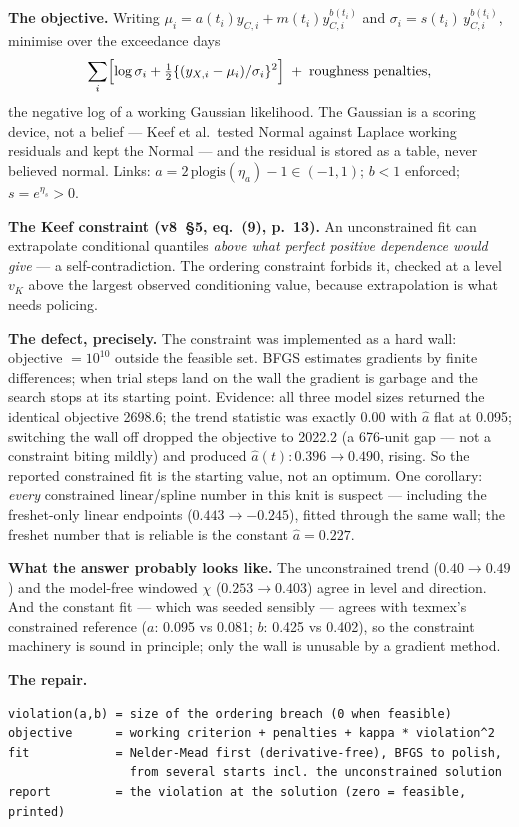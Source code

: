 \documentclass[11pt]{article}
\begin{document}
\textbf{The objective.} Writing $\mu_i = a(t_i) y_{C,i} + m(t_i)
y_{C,i}^{b(t_i)}$ and $\sigma_i = s(t_i)\, y_{C,i}^{b(t_i)}$, minimise over
the exceedance days
\[
\sum_i \Bigl[\log \sigma_i + \tfrac12\{(y_{X,i} - \mu_i)/\sigma_i\}^2\Bigr]
\;+\; \text{roughness penalties},
\]
the negative log of a working Gaussian likelihood. The Gaussian is a scoring
device, not a belief --- Keef et al.\ tested Normal against Laplace working
residuals and kept the Normal --- and the residual is stored as a table, never
believed normal. Links: $a = 2\,\mathrm{plogis}(\eta_a) - 1 \in (-1,1)$;
$b < 1$ enforced; $s = e^{\eta_s} > 0$.

\textbf{The Keef constraint (v8~\S5, eq.~(9), p.~13).} An unconstrained fit
can extrapolate conditional quantiles \emph{above what perfect positive
dependence would give} --- a self-contradiction. The ordering constraint
forbids it, checked at a level $v_K$ above the largest observed conditioning
value, because extrapolation is what needs policing.

\textbf{The defect, precisely.} The constraint was implemented as a hard
wall: objective $= 10^{10}$ outside the feasible set. BFGS estimates
gradients by finite differences; when trial steps land on the wall the
gradient is garbage and the search stops at its starting point. Evidence:
all three model sizes returned the identical objective 2698.6; the trend
statistic was exactly 0.00 with $\hat a$ flat at 0.095; switching the wall
off dropped the objective to 2022.2 (a 676-unit gap --- not a constraint
biting mildly) and produced $\hat a(t): 0.396 \to 0.490$, rising. So the
reported constrained fit is the starting value, not an optimum. One
corollary: \emph{every} constrained linear/spline number in this knit is
suspect --- including the freshet-only linear endpoints ($0.443 \to -0.245$),
fitted through the same wall; the freshet number that is reliable is the
constant $\hat a = 0.227$.

\textbf{What the answer probably looks like.} The unconstrained trend
($0.40 \to 0.49$) and the model-free windowed $\chi$ ($0.253 \to 0.403$)
agree in level and direction. And the constant fit --- which was seeded
sensibly --- agrees with texmex's constrained reference ($a$: 0.095 vs
0.081; $b$: 0.425 vs 0.402), so the constraint machinery is sound in
principle; only the wall is unusable by a gradient method.

\textbf{The repair.}
\begin{Verbatim}[fontsize=\small]
violation(a,b) = size of the ordering breach (0 when feasible)
objective      = working criterion + penalties + kappa * violation^2
fit            = Nelder-Mead first (derivative-free), BFGS to polish,
                 from several starts incl. the unconstrained solution
report         = the violation at the solution (zero = feasible, printed)
\end{Verbatim}
\end{document}
